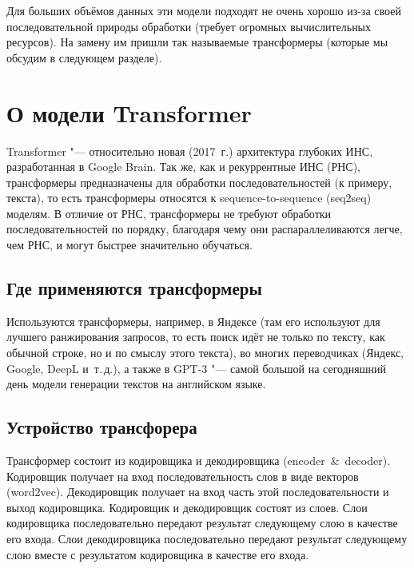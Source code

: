 Для больших объёмов данных эти модели подходят не очень хорошо из-за своей последовательной природы обработки (требует огромных вычислительных ресурсов). На замену им пришли так называемые трансформеры (которые мы обсудим в следующем разделе).


\section{О модели Transformer}


Transformer "--- относительно новая (2017~г.) архитектура глубоких ИНС, разработанная в Google Brain.
Так же, как и рекуррентные ИНС (РНС), трансформеры предназначены для обработки последовательностей (к примеру, текста), то есть трансформеры относятся к sequence-to-sequence (seq2seq) моделям. В отличие от РНС, трансформеры не требуют обработки последовательностей по порядку, благодаря чему они распараллеливаются легче, чем РНС, и могут быстрее значительно обучаться.


\subsection{Где применяются трансформеры}


Используются трансформеры, например, в Яндексе (там его используют для лучшего ранжирования запросов, то есть поиск идёт не только по тексту, как обычной строке, но и по смыслу этого текста), во многих переводчиках (Яндекс, Google, DeepL и~т.\,д.), а также в GPT-3 "--- самой большой на сегодняшний день модели генерации текстов на английском языке.


\subsection{Устройство трансфорера}


Трансформер состоит из кодировщика и декодировщика (encoder~\&~decoder). Кодировщик получает на вход последовательность слов в виде векторов (word2vec). Декодировщик получает на вход часть этой последовательности и выход кодировщика. Кодировщик и декодировщик состоят из слоев. Слои кодировщика последовательно передают результат следующему слою в качестве его входа. Слои декодировщика последовательно передают результат следующему слою вместе с результатом кодировщика в качестве его входа.

